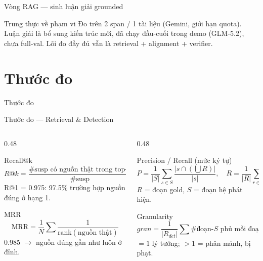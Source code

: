 \documentclass[aspectratio=169,11pt]{beamer}
\def\textbf#1{#1}%
\begin{document}
\begin{frame}{Vòng RAG — sinh luận giải grounded}
\vspace{-0.05cm}
\begin{block}{Trung thực về phạm vi}
\scriptsize Đo trên \textbf{2 span / 1 tài liệu} (Gemini, giới hạn quota). Luận giải là \textbf{bổ sung kiến trúc mới}, đã chạy đầu-cuối trong demo (GLM-5.2), chưa full-val. Lõi đo đầy đủ vẫn là retrieval + alignment + verifier.
\end{block}
\end{frame}

\section{Thước đo}
{
\begin{frame}[plain]
    \vfill\centering
    \textcolor{hcmusblue}{\textbf{\Huge Thước đo}}
    \vfill
\end{frame}
}

\begin{frame}{Thước đo — Retrieval \& Detection}
\small
\begin{columns}[T]
\begin{column}{0.48\textwidth}
\begin{block}{Recall@k}
\[ R@k = \frac{\#\text{susp có nguồn thật trong top-k}}{\#\text{susp}} \]
\footnotesize \textbf{R@1 = 0.975}: 97.5\% trường hợp nguồn đúng ở hạng 1.
\end{block}
\begin{block}{MRR}
\[ \mathrm{MRR} = \frac{1}{N}\sum \frac{1}{\mathrm{rank}(\text{nguồn thật})} \]
\footnotesize \textbf{0.985} $\rightarrow$ nguồn đúng gần như luôn ở đỉnh.
\end{block}
\end{column}
\begin{column}{0.48\textwidth}
\begin{block}{Precision / Recall (mức ký tự)}
\[ P = \frac{1}{|S|}\sum_{s\in S}\frac{|s\cap(\bigcup R)|}{|s|}, \quad
   R = \frac{1}{|R|}\sum_{r\in R}\frac{|r\cap(\bigcup S)|}{|r|} \]
\footnotesize $R$ = đoạn gold, $S$ = đoạn hệ phát hiện.
\end{block}
\begin{block}{Granularity}
\[ gran = \frac{1}{|R_{det}|}\sum \#\text{đoạn-}S\text{ phủ mỗi đoạn-}R \]
\footnotesize $=1$ lý tưởng; $>1$ = phân mảnh, bị phạt.
\end{block}
\end{column}
\end{columns}
\end{frame}
\end{document}
